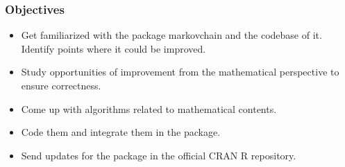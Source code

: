 \begin{frame}\frametitle{Objectives}
 \vspace{2em}
  \begin{itemize}
  \item Get familiarized with the package markovchain and the codebase of it. Identify points where it could be improved.
  \item Study opportunities of improvement from the mathematical perspective to ensure correctness.
  \item Come up with algorithms related to mathematical contents.
  \item Code them and integrate them in the package.
  \item Send updates for the package in the official CRAN R repository.
  \end{itemize}
 \end{frame}
